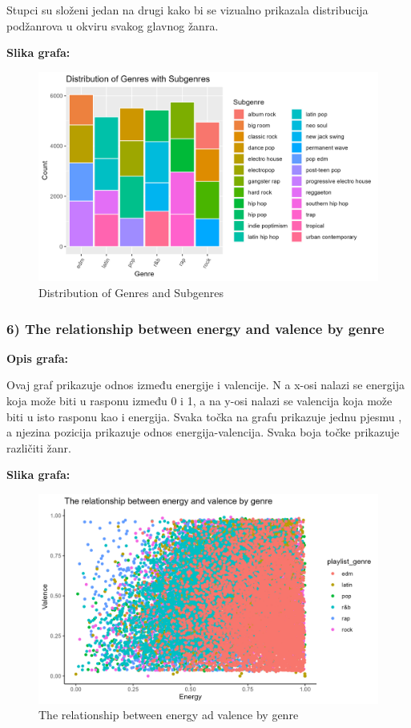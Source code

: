 		Stupci su složeni jedan na drugi kako bi se vizualno prikazala distribucija podžanrova u okviru svakog glavnog žanra. 
	
	
	\textbf{Slika grafa:}
	\begin{figure}[H]
		\includegraphics[scale=0.9]{slike/Genre-Subgenre.png}
		\centering
		\caption{Distribution of Genres and Subgenres}
		
	\end{figure}


		\subsubsection{6) The relationship between energy and valence by genre}
    
    \textbf{Opis grafa:}
    
    	Ovaj graf prikazuje odnos između energije i valencije. N a x-osi nalazi se energija koja može biti u rasponu između 0 i 1, a na y-osi nalazi se valencija koja može biti u isto rasponu kao i energija. Svaka točka na grafu prikazuje jednu pjesmu , a njezina pozicija prikazuje odnos energija-valencija. Svaka boja točke prikazuje različiti žanr. 
    
    \textbf{Slika grafa:}
    \begin{figure}[H]
        \includegraphics[scale=0.9]{slike/The relationship between energy and valence by genre.png}
        \centering
        \caption{The relationship between energy ad valence by genre}
        
    \end{figure}

